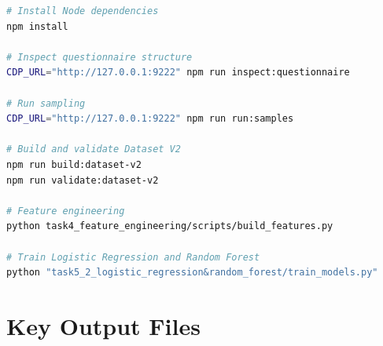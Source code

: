 \documentclass[11pt,a4paper]{article}
\begin{document}
\begin{lstlisting}[language=bash, caption={Main replication commands}]
# Install Node dependencies
npm install

# Inspect questionnaire structure
CDP_URL="http://127.0.0.1:9222" npm run inspect:questionnaire

# Run sampling
CDP_URL="http://127.0.0.1:9222" npm run run:samples

# Build and validate Dataset V2
npm run build:dataset-v2
npm run validate:dataset-v2

# Feature engineering
python task4_feature_engineering/scripts/build_features.py

# Train Logistic Regression and Random Forest
python "task5_2_logistic_regression&random_forest/train_models.py"
\end{lstlisting}

\section{Key Output Files}
\end{document}
